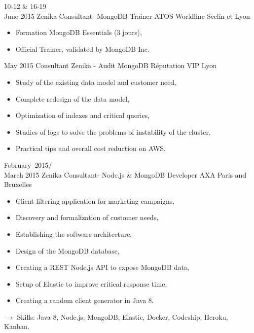 \documentclass[11pt,a4paper]{moderncv}
\begin{document}
\cventry
{10-12 \& 16-19\\ June 2015}
{Zenika Consultant- MongoDB Trainer}
{ATOS Worldline}
{Seclin et Lyon}
{}
{\begin{itemize}
\item Formation MongoDB Essentials (3 jours),
\item Official Trainer, validated by MongoDB Inc.
\end{itemize}
}   %

\cventry
{May 2015}
{Consultant Zenika - Audit MongoDB}
{Réputation VIP}
{Lyon}
{}
{\begin{itemize}
\item Study of the existing data model and customer need,
\item Complete redesign of the data model,
\item Optimization of indexes and critical queries,
\item Studies of logs to solve the problems of instability of the cluster,
\item Practical tips and overall cost reduction on AWS.
\end{itemize}
}   %

\cventry
{February\ 2015/\\March 2015}
{Zenika Consultant- Node.js \& MongoDB Developer}
{AXA}
{Paris and Bruxelles}
{}
{\begin{itemize}
\item Client filtering application for marketing campaigns,
\item Discovery and formalization of customer needs,
\item Establishing the software architecture,
\item Design of the MongoDB database,
\item Creating a REST Node.js API to expose MongoDB data,
\item Setup of Elastic to improve critical response time,
\item Creating a random client generator in Java 8.
\end{itemize}
$\rightarrow$ Skills: Java 8, Node.js, MongoDB, Elastic, Docker, Codeship, Heroku, Kanban.
}   %
\end{document}
